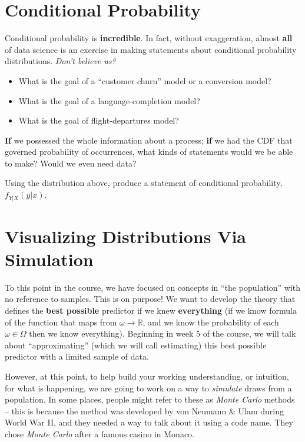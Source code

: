 \documentclass[
  letterpaper,
  DIV=11,
  numbers=noendperiod]{scrreprt}
\providecommand{\tightlist}{%
  \setlength{\itemsep}{0pt}\setlength{\parskip}{0pt}}\usepackage{longtable,booktabs,array}
\begin{document}
\section{Conditional Probability}\label{conditional-probability}

Conditional probability is \textbf{incredible}. In fact, without
exaggeration, almost \textbf{all} of data science is an exercise in
making statements about conditional probability distributions.
\emph{Don't believe us?}

\begin{itemize}
\tightlist
\item
  What is the goal of a ``customer churn'' model or a conversion model?
\item
  What is the goal of a language-completion model?
\item
  What is the goal of flight-departures model?
\end{itemize}

\textbf{If} we possessed the whole information about a process;
\textbf{if} we had the CDF that governed probability of occurrences,
what kinds of statements would we be able to make? Would we even need
data?

Using the distribution above, produce a statement of conditional
probability, \(f_{Y|X}(y|x)\).

\section{Visualizing Distributions Via
Simulation}\label{visualizing-distributions-via-simulation}

To this point in the course, we have focused on concepts in ``the
population'' with no reference to samples. This is on purpose! We want
to develop the theory that defines the \textbf{best possible} predictor
if we knew \textbf{everything} (if we know formula of the function that
maps from \(\omega \rightarrow \mathbb{R}\), and we know the probability
of each \(\omega \in \Omega\) then we know everything). Beginning in
week 5 of the course, we will talk about ``approximating'' (which we
will call estimating) this best possible predictor with a limited sample
of data.

However, at this point, to help build your working understanding, or
intuition, for what is happening, we are going to work on a way to
\emph{simulate} draws from a population. In some places, people might
refer to these as \emph{Monte Carlo} methods -- this is because the
method was developed by von Neumann \& Ulam during World War II, and
they needed a way to talk about it using a code name. They chose
\emph{Monte Carlo} after a famous casino in Monaco.
\end{document}
